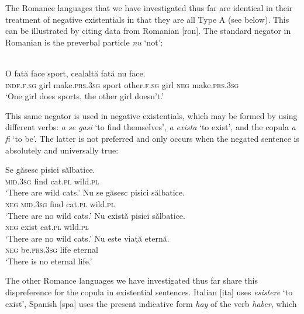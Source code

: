 \documentclass[output=paper,colorlinks,citecolor=brown]{langscibook}
\begin{document}
The Romance languages that we have investigated thus far are identical in
their treatment of negative existentials in that they are all Type A (see
 below). This can be illustrated by citing
data from Romanian [ron]. The standard negator in Romanian is the preverbal particle \textit{nu} `not':
%
\begin{exe}\ex
{}\\
    \gll O fată  face sport, cealaltă fată nu face.  \\
\textsc{indf.f.sg}   girl  make.\textsc{prs.3sg} sport other.\textsc{f.sg}
girl \textsc{neg}  make.\textsc{prs.3sg} \\
    \glt `One girl does sports, the other girl doesn't.'
    \end{exe}
%
This same negator is used in negative existentials, which may be formed by
using different verbs: \textit{a se gasi} `to find
themselves', \textit{a exista} `to exist', and the copula
\textit{a fi} `to be'. The latter is not preferred and only occurs
when the negated sentence is absolutely and universally true:
%
\begin{exe}\ex
{}
\begin{xlist}
\ex
    \gll Se găsesc  pisici  sălbatice.   \\
\textsc{mid.3sg}  find       cat.\textsc{pl}  wild.\textsc{pl} \\
    \glt `There are wild cats.'
\ex
    \gll Nu se găsesc  pisici  sălbatice. \\
    \textsc{neg} \textsc{mid.3sg} find cat.\textsc{pl} wild.\textsc{pl}\\
    \glt `There are no wild cats.'
\ex
    \gll Nu      există   pisici  sălbatice. \\
    \textsc{neg}  exist      cat.\textsc{pl}  wild.\textsc{pl}\\
    \glt `There are no wild cats.'
\ex
    \gll Nu   este viaţă eternă.\\
    \textsc{neg}  be.\textsc{prs.3sg}  life    eternal\\
\glt `There is no eternal life.'
    \end{xlist}\end{exe}
%
The other Romance languages we have investigated thus far share this
dispreference for the copula in existential sentences. Italian
[ita] uses \textit{esistere} `to exist', Spanish [spa] uses the
present indicative form \textit{hay} of the verb \textit{haber}, which
\end{document}
